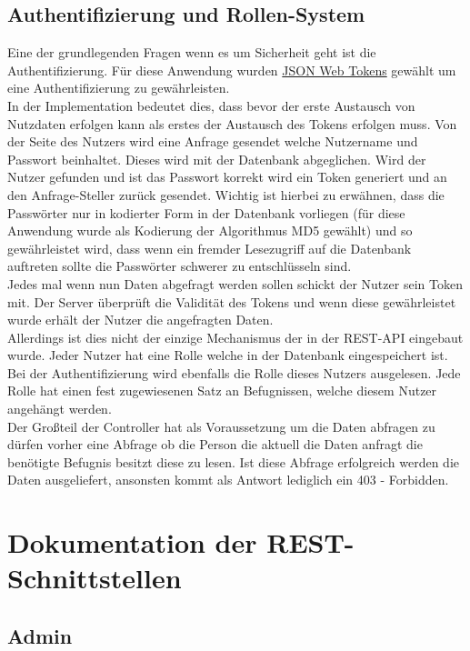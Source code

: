 \subsection{Authentifizierung und Rollen-System}

Eine der grundlegenden Fragen wenn es um Sicherheit geht ist die Authentifizierung. Für diese Anwendung wurden \hyperref[JWT]{JSON Web Tokens} gewählt um eine Authentifizierung zu gewährleisten. \\
In der Implementation bedeutet dies, dass bevor der erste Austausch von Nutzdaten erfolgen kann als erstes der Austausch des Tokens erfolgen muss. Von der Seite des Nutzers wird eine Anfrage gesendet welche Nutzername und Passwort beinhaltet. Dieses wird mit der Datenbank abgeglichen. Wird der Nutzer gefunden und ist das Passwort korrekt wird ein Token generiert und an den Anfrage-Steller zurück gesendet. Wichtig ist hierbei zu erwähnen, dass die Passwörter nur in kodierter Form in der Datenbank vorliegen (für diese Anwendung wurde als Kodierung der Algorithmus MD5 gewählt) und so gewährleistet wird, dass wenn ein fremder Lesezugriff auf die Datenbank auftreten sollte die Passwörter schwerer zu entschlüsseln sind. \\
Jedes mal wenn nun Daten abgefragt werden sollen schickt der Nutzer sein Token mit. Der Server überprüft die Validität des Tokens und wenn diese gewährleistet wurde erhält der Nutzer die angefragten Daten. \\

Allerdings ist dies nicht der einzige Mechanismus der in der REST-API eingebaut wurde. Jeder Nutzer hat eine Rolle welche in der Datenbank eingespeichert ist. Bei der Authentifizierung wird ebenfalls die Rolle dieses Nutzers ausgelesen. Jede Rolle hat einen fest zugewiesenen Satz an Befugnissen, welche diesem Nutzer angehängt werden. \\
Der Großteil der Controller hat als Voraussetzung um die Daten abfragen zu dürfen vorher eine Abfrage ob die Person die aktuell die Daten anfragt die benötigte Befugnis besitzt diese zu lesen. Ist diese Abfrage erfolgreich werden die Daten ausgeliefert, ansonsten kommt als Antwort lediglich ein 403 - Forbidden.

\section{Dokumentation der REST-Schnittstellen}

\subsection{Admin}

